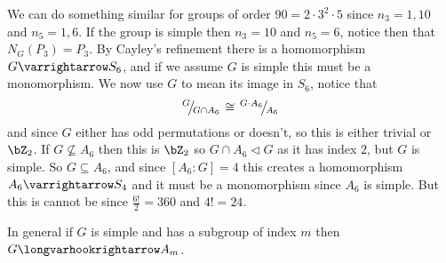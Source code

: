 \documentclass[10pt]{article}
\def\slfrac#1#2{\left.{}^{#1}\mkern-4mu\middle/\mkern-3mu{}_{#2}\right.}
\begin{document}
\begin{exam*}

    We can do something similar for groups of order $90=2\cdot3^2\cdot5$ since $n_3=1,10$ and $n_5=1,6$.
    If the group is simple then $n_3=10$ and $n_5=6$, notice then that $N_G(P_3)=P_3$.
    By Cayley's refinement there is a homomorphism $G\varrightarrow S_6$, and if we assume $G$ is simple this must be a monomorphism.
    We now use $G$ to mean its image in $S_6$, notice that
    \[ \slfrac{G}{G\cap A_6} \cong \slfrac{G\cdot A_6}{A_6} \]
    and since $G$ either has odd permutations or doesn't, so this is either trivial or $\bZ_2$.
    If $G\not\subseteq A_6$ then this is $\bZ_2$ so $G\cap A_6\triangleleft G$ as it has index $2$, but $G$ is simple.
    So $G\subseteq A_6$, and since $[A_6:G]=4$ this creates a homomorphism $A_6\varrightarrow S_4$ and it must be a monomorphism since $A_6$ is simple.
    But this is cannot be since $\frac{6!}2=360$ and $4!=24$.

\end{exam*}

In general if $G$ is simple and has a subgroup of index $m$ then $G\longvarhookrightarrow A_m$.
\end{document}
